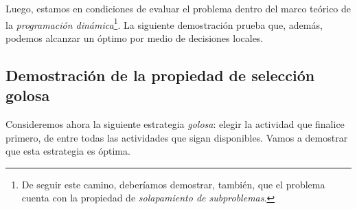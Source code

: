 Luego, estamos en condiciones de evaluar el problema dentro del marco teórico de la \textit{programación dinámica}\footnote{De seguir este camino, deberíamos demostrar, también, que el problema cuenta con la propiedad de \textit{solapamiento de subproblemas}.}. La siguiente demostración prueba que, además, podemos alcanzar un óptimo por medio de decisiones locales. 

\subsection{Demostración de la propiedad de selección golosa} Consideremos ahora la siguiente estrategia \textit{golosa}: elegir la actividad que finalice primero, de entre todas las actividades que sigan disponibles. Vamos a demostrar que esta estrategia es óptima.

